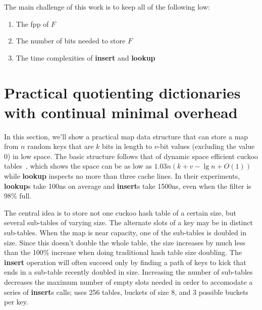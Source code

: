 \documentclass[11pt,letterpaper]{article}
\begin{document}
The main challenge of this work is to keep all of the following low:

\begin{enumerate}
\item The fpp of $F$
\item The number of bits needed to store $F$
\item The time complexities of {\bf insert} and {\bf lookup}
\end{enumerate}

\section{Practical quotienting dictionaries with continual minimal overhead}


In this section, we'll show a practical map data structure that can store a map from $n$ random keys that are $k$ bits in length to $v$-bit values (excluding the value $0$) in low space.
The basic structure follows that of dynamic space efficient cuckoo tables~\cite{maier2019dynamic}, which shows the space can be as low as $1.03 n (k + v - \lg n + O(1))$ while {\bf lookup} inspects no more than three cache lines.
In their experiments, {\bf lookup}s take 100ns on average and {\bf insert}s take 1500ns, even when the filter is 98\% full.

The central idea is to store not one cuckoo hash table of a certain size, but several sub-tables of varying size.
The alternate slots of a key may be in distinct sub-tables.
When the map is near capacity, one of the sub-tables is doubled in size.
Since this doesn't double the whole table, the size increases by much less than the 100\% increase when doing traditional hash table size doubling.
The {\bf insert} operation will often succeed only by finding a path of keys to kick that ends in a sub-table recently doubled in size.
Increasing the number of sub-tables decreases the maximum number of empty slots needed in order to accomodate a series of {\bf insert}s calls; \cite{maier2019dynamic} uses 256 tables, buckets of size 8, and 3 possible buckets per key.


\end{document}
